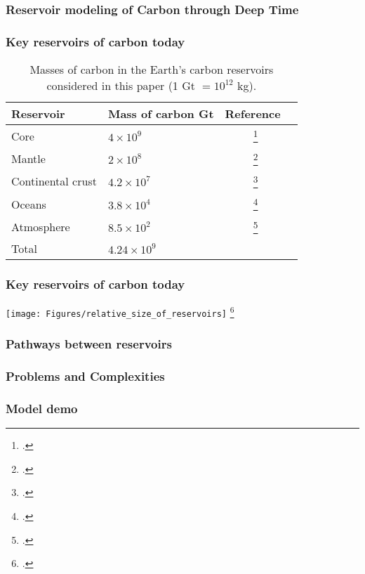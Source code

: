 \documentclass{beamer}
\newcommand{\upperRomannumeral}[1]{\uppercase\expandafter{\romannumeral#1}}
\begin{document}
  \begin{frame}
    \frametitle{Reservoir modeling of Carbon through Deep Time}
  \end{frame}

  \begin{frame}
    \frametitle{Key reservoirs of carbon today \upperRomannumeral{1}}
    \begin{table}
        \centering
        \begin{tabular}{|l|l|c|c|}
            \hline
            Reservoir & Mass of carbon Gt & Reference \\
            \hline
            Core   & $4 \times 10^9$ & ~\footcite{DR:2013}  \\
            \hline
            Mantle & $2 \times 10^8$ & ~\footcite{KLH-TDL-WM:2018}  \\
            \hline
            Continental crust & $4.2 \times 10^7$ & ~\footcite{KHW:1995} \\
            \hline
            Oceans & $3.8 \times 10^4$ & ~\footcite{HRA:2007} \\
            \hline
            Atmosphere & $8.5 \times 10^2$ & ~\footcite{NOAA:2017} \\
            \hline
            Total & $4.24 \times 10^9$ & \\
            \hline
        \end{tabular}
        \caption{Masses of carbon in the Earth's carbon reservoirs considered in this paper (1 Gt $= 10^{12}$ kg).
        }
        \label{Table:Masses of carbon in Earth's reservoirs}
    \end{table}

  \end{frame}

  \begin{frame}
    \frametitle{Key reservoirs of carbon today \upperRomannumeral{2}}
    \texttt{[image: Figures/relative\_size\_of\_reservoirs]}
    \footcite{KLH-TDL-WM:2018}
  \end{frame}

  \begin{frame}
    \frametitle{Pathways between reservoirs}
  \end{frame}

  \begin{frame}
    \frametitle{Problems and Complexities}
  \end{frame}

  \begin{frame}
    \frametitle{Model demo}
  \end{frame}
\end{document}
